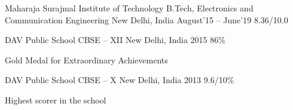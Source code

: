 


\begin{cventries}
  \smallcventry
  {Maharaja Surajmal Institute of Technology}
  {B.Tech, Electronics and Communication Engineering}
  {New Delhi, India}
  {August'15 -- June'19}
  {8.36/10.0}
  {}
\end{cventries}
\begin{cventries}
  \smallcventry
  {DAV Public School}
  {CBSE -- XII}
  {New Delhi, India}
  {2015}
  {86\%}
  {
    \begin{cvitems}
    \item Gold Medal for Extraordinary Achievements
    \end{cvitems}
  }
\end{cventries}
\begin{cventries}
  \smallcventry
  {DAV Public School}
  {CBSE -- X}
  {New Delhi, India}
  {2013}
  {9.6/10\%}
  {
    \begin{cvitems}
    \item Highest scorer in the school
    \end{cvitems}
  }
\end{cventries}
\vspace{-2mm}
